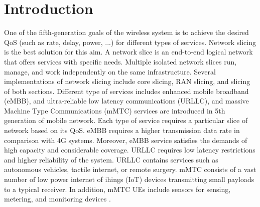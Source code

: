 \documentclass[conference]{IEEEtran}
\begin{document}
\section{Introduction} 
One of the fifth-generation goals of the wireless system is to achieve the desired QoS (such as rate, delay, power, ...) for different types of services. Network slicing is the best solution for this aim. A network slice is an end-to-end logical network that offers services with specific needs.  
Multiple isolated network slices run, manage, and work independently on the same infrastructure. 
Several implementations of network slicing include core slicing, RAN slicing, and slicing of both sections. 
Different type of services includes enhanced mobile broadband (eMBB), and ultra-reliable low latency communications (URLLC), and massive Machine Type Communications (mMTC) services are introduced in 5th generation of mobile network. Each type of service requires a particular slice of network based on its QoS.
eMBB requires a higher transmission data rate in comparison with 4G systems. Moreover, eMBB service satisfies the demands of high capacity and considerable coverage.
URLLC requires low latency restrictions and higher reliability of the system.
URLLC contains services such as autonomous vehicles, tactile internet, or remote surgery.
mMTC consists of a vast number of low power internet of ihings (IoT) devices transmitting small payloads to a typical receiver. In addition, mMTC UEs include sensors for sensing, metering, and monitoring devices 
\cite{shen2020ai,setayesh2020joint,popovski20185g,dogra2020survey,kassab2018coexistence,alsenwi2021intelligent}.
\end{document}
